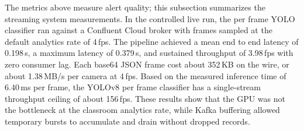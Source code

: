 \documentclass[conference]{IEEEtran}
\begin{document}
The metrics above measure alert quality; this subsection summarizes the
streaming system measurements. In the controlled live run, the per frame YOLO
classifier ran against a Confluent Cloud broker with frames sampled at the
default analytics rate of 4\,fps. The pipeline achieved a mean end to end
latency of 0.198\,s, a maximum latency of 0.379\,s, and sustained throughput of
3.98\,fps with zero consumer lag. Each base64 JSON frame cost about 352\,KB on
the wire, or about 1.38\,MB/s per camera at 4\,fps. Based on the measured
inference time of 6.40\,ms per frame, the YOLOv8 per frame classifier has a
single-stream throughput ceiling of about 156\,fps. These results show that the
GPU was not the bottleneck at the classroom analytics rate, while Kafka buffering
allowed temporary bursts to accumulate and drain without dropped records.


\end{document}
